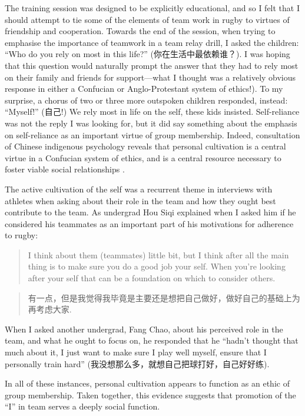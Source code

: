 \begin{CJK}{UTF8}{gbsn}
The training session was designed to be explicitly educational, and so I felt that I should attempt to tie some of the elements of team work in rugby to virtues of friendship and cooperation.  Towards the end of the session, when trying to emphasise the importance of teamwork in a team relay drill, I asked the children: ``Who do you rely on most in this life?'' (你在生活中最依赖谁？).  I was hoping that this question would naturally prompt the answer that they had to rely most on their family and friends for support---what I thought was a relatively obvious response in either a Confucian or Anglo-Protestant system of ethics!).  To my surprise, a chorus of two or three more outspoken children responded, instead: ``Myself!'' (自己!) We rely most in life on the self, these kids insisted. Self-reliance was not the reply I was looking for, but it did say something about the emphasis on self-reliance as an important virtue of group membership.  Indeed, consultation of Chinese indigenous psychology reveals that personal cultivation is a central virtue in a Confucian system of ethics, and is a central resource necessary to foster viable social relationships \citep{Liu2014}.

The active cultivation of the self was a recurrent theme in interviews with athletes when asking about their role in the team and how they ought best contribute to the team.  As undergrad Hou Siqi explained when I asked him if he considered his teammates as an important part of his motivations for adherence to rugby:
   \begin{quote}
       I think about them (teammates) little bit, but I think after all the main thing is to make sure you do a good job your self.  When you're looking after your self that can be a foundation on which to consider others.
   \end{quote}
   \begin{quote}
         有一点，但是我觉得我毕竟是主要还是想把自己做好，做好自己的基础上为再考虑大家.
   \end{quote}

When I asked another undergrad, Fang Chao, about his perceived role in the team, and what he ought to focus on, he responded that he ``hadn't thought that much about it, I just want to make sure I play well myself, ensure that I personally train hard'' (我没想那么多，就想自己把球打好，自己好好练).

In all of these instances, personal cultivation appears to function as an ethic of group membership.  Taken together, this evidence suggests that promotion of the ``I'' in team serves a deeply social function.




\end{CJK}
